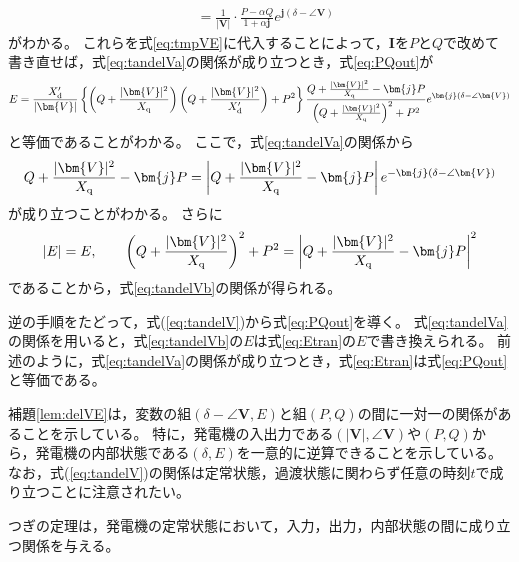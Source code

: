 \documentclass[tombow,dvipdfmx]{corona-a5-1.1}
\begin{document}
\begin{証明}
\begin{align*}
& =
\frac{1}{|\bm{V}|} \cdot
\frac{ P - \alpha Q}{ 1+\alpha \bm{j} }e^{\bm{j}(\delta - \angle \bm{V})}
\end{align*}
がわかる。
これらを式\ref{eq:tmpVE}に代入することによって，$\bm{I}$を$P$と$Q$で改めて書き直せば，式\ref{eq:tandelVa}の関係が成り立つとき，式\ref{eq:PQout}が
\begin{align}\label{eq:Etran}
E=
\frac{X_{\rm d}'}{|\bm{V}| } 
\left\{
\left(Q + \frac{|\bm{V}|^2}{X_{\rm q}} \right) \left(Q + \frac{|\bm{V}|^2}{X_{\rm d}'} \right) +P^2
\right\}
\frac{  Q + \tfrac{|\bm{V}|^2}{X_{\rm q}} - \bm{j} P }
{   \left( Q + \tfrac{|\bm{V}|^2}{X_{\rm q}} \right)^2 + P^2   }
e^{\bm{j}(\delta - \angle \bm{V})}
\end{align}
と等価であることがわかる。
ここで，式\ref{eq:tandelVa}の関係から
\begin{align*}
Q + \frac{|\bm{V}|^2}{X_{\rm q}} - \bm{j} P
= 
\left|Q + \frac{|\bm{V}|^2}{X_{\rm q}} - \bm{j} P \right|
e^{-\bm{j}(\delta - \angle \bm{V})}
\end{align*}
が成り立つことがわかる。
さらに
\[
|E|=E
,\qquad
\left( Q + \frac{|\bm{V}|^2}{X_{\rm q}} \right)^2 + P^2
=
\left|Q + \frac{|\bm{V}|^2}{X_{\rm q}} - \bm{j} P \right|^2
\]
であることから，式\ref{eq:tandelVb}の関係が得られる。

逆の手順をたどって，式(\ref{eq:tandelV})から式\ref{eq:PQout}を導く。
式\ref{eq:tandelVa}の関係を用いると，式\ref{eq:tandelVb}の$E$は式\ref{eq:Etran}の$E$で書き換えられる。
前述のように，式\ref{eq:tandelVa}の関係が成り立つとき，式\ref{eq:Etran}は式\ref{eq:PQout}と等価である。
\end{証明}

補題\ref{lem:delVE}は，変数の組$(\delta - \angle \bm{V},E)$と組$(P,Q)$の間に一対一の関係があることを示している。
特に，発電機の入出力である$(|\bm{V}|,\angle \bm{V})$や$(P,Q)$から，発電機の内部状態である$(\delta,E)$を一意的に逆算できることを示している。
なお，式(\ref{eq:tandelV})の関係は定常状態，過渡状態に関わらず任意の時刻$t$で成り立つことに注意されたい。

つぎの定理は，発電機の定常状態において，入力，出力，内部状態の間に成り立つ関係を与える。
\end{document}
